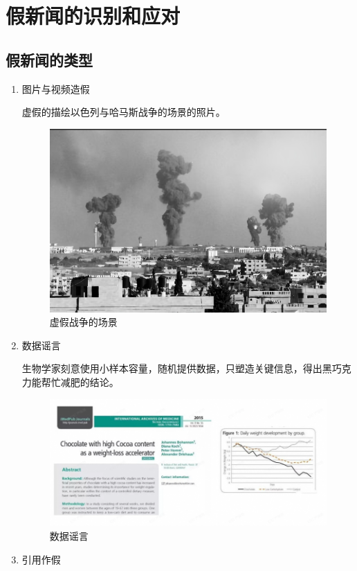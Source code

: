 \documentclass{amznotes}
\begin{document}
    \setlength{\parindent}{2em}
    
    \setcounter{tocdepth}{1}
    \tableofcontents
    \newpage
    \chapter{假新闻的识别和应对}
\section{假新闻的类型}
\begin{enumerate}
  \item 图片与视频造假

  虚假的描绘以色列与哈马斯战争的场景的照片。
  \begin{figure}[H]
    \centering
    \includegraphics[width=.7\textwidth]{figures/假新闻/哈马斯.png}
    \caption{虚假战争的场景}
  \end{figure}
  \item 数据谣言

  生物学家刻意使用小样本容量，随机提供数据，只塑造关键信息，得出黑巧克力能帮忙减肥的结论。
  \begin{figure}[H]
    \centering
    \includegraphics[width=.7\textwidth]{figures/假新闻/减肥.png}
    \caption{数据谣言}
  \end{figure}

  \item 引用作假


\end{enumerate}
\end{document}

